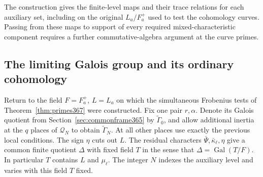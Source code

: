 \documentclass[a4paper,11pt]{article}
\theoremstyle{definition}
\theoremstyle{remark}
\numberwithin{equation}{section}
\begin{document}
The construction gives the finite-level maps and their
trace relations for each auxiliary set, including on the
original \(L_a/F_a^+\) used to test the cohomology curves.
Passing from these maps to support of every required
mixed-characteristic component requires a further
commutative-algebra argument at the curve primes.


\subsection{The limiting Galois group and its ordinary cohomology}
\label{sec:liminertia407}

Return to the field \(F=F_a^+\), \(L=L_a\) on which the
simultaneous Frobenius tests of Theorem~\ref{thm:primes367}
were constructed. Fix one pair \(r,\alpha\). Denote its
Galois quotient from Section~\ref{sec:commonframe365} by
\(\widetilde\Gamma_0\), and allow additional inertia at
the \(q\) places of \(\mathcal Q_N\) to obtain
\(\widetilde\Gamma_N\). At all other places use exactly the
previous local conditions. The sign \(\eta\) cuts out \(L\).
The residual characters \(\bar\Psi,\bar\kappa_\ell,\eta\)
give a common finite quotient \(\Delta\) with fixed field
\(T\) in the sense that \(\Delta=\operatorname{Gal}(T/F)\).
In particular \(T\) contains \(L\) and \(\mu_\ell\).
The integer \(N\) indexes the auxiliary level and varies
with this field \(T\) fixed.
\end{document}

